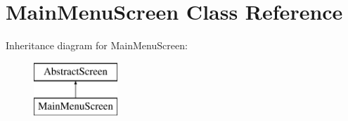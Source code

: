 \hypertarget{class_main_menu_screen}{}\section{Main\+Menu\+Screen Class Reference}
\label{class_main_menu_screen}
Inheritance diagram for Main\+Menu\+Screen\+:\begin{figure}[H]
\begin{center}
\leavevmode
\includegraphics[height=2.000000cm]{class_main_menu_screen}
\end{center}
\end{figure}
